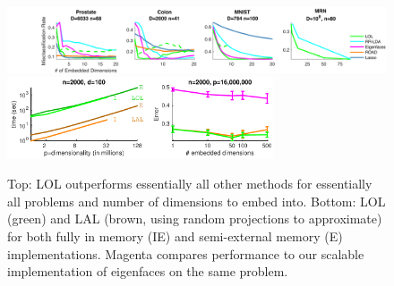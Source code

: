 \documentclass[simplex.tex]{subfiles}
\begin{document}
\begin{figure}[h!]
\begin{cframed}
		\centering
		\includegraphics[width=1.0\textwidth]{../../figs/plot_real}
    \includegraphics[width=0.7\textwidth]{../../figs/scalability}
    \caption{Top: LOL outperforms essentially all other methods for essentially all problems and number of dimensions to embed into.  Bottom: LOL (green) and LAL (brown, using random projections to approximate) for both fully in memory (IE) and semi-external memory (E) implementations.  Magenta compares performance to our scalable implementation of eigenfaces on the same problem.   }
		\label{fig:lolall}
		\end{cframed}
\end{figure}


\clearpage
\end{document}
